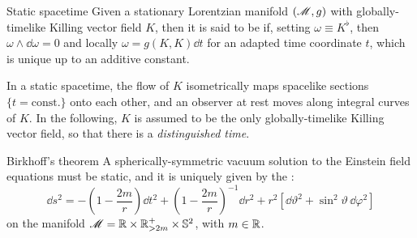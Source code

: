 \begin{definition}{Static spacetime}{}
  Given a stationary Lorentzian manifold $ (\mathscr{M} , g) $ with globally-timelike Killing vector field $ K $, then it is said to be  if, setting $ \omega \equiv K^\flat $, then $ \omega \wedge \dd \omega = 0 $ and locally $ \omega = g(K , K) \dd t $ for an adapted time coordinate $ t $, which is unique up to an additive constant.
\end{definition}

In a static spacetime, the flow of $ K $ isometrically maps spacelike sections $ \{t = \text{const.}\} $ onto each other, and an observer at rest moves along integral curves of $ K $. In the following, $ K $ is assumed to be the only globally-timelike Killing vector field, so that there is a \emph{distinguished time}.

\begin{theorem}{Birkhoff's theorem}{}
  A spherically-symmetric vacuum solution to the Einstein field equations must be static, and it is uniquely given by the :
  \begin{equation}
    \dd s^2 = - \left( 1 - \frac{2m}{r} \right) \dd t^2 + \left( 1 - \frac{2m}{r} \right)^{-1} \dd r^2 + r^2 \left[ \dd \vartheta^2 + \sin^2 \vartheta \, \dd \varphi^2 \right]
    \label{eq:schwarz-sol}
  \end{equation}
  on the manifold $ \mathscr{M} = \mathbb{R} \times \mathbb{R}^+_{> 2m} \times \mathbb{S}^{2} $, with $ m \in \mathbb{R} $.
\end{theorem}

